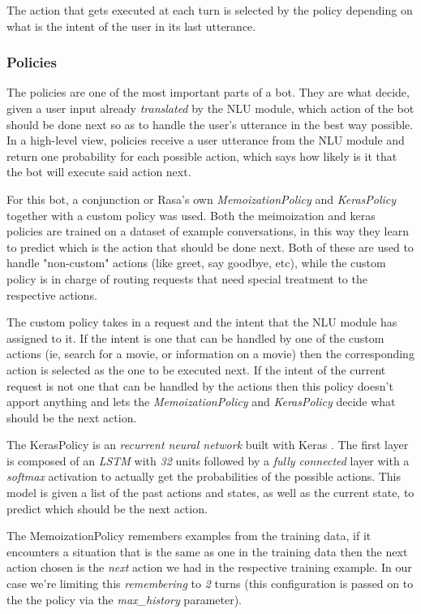 \documentclass[11pt,a4paper]{article}
\begin{document}
			The action that gets executed at each turn is selected by the policy depending on what is the intent of the user in its last utterance. 

		\subsubsection{Policies}
		\label{ssec-policies}	
			
			The policies are one of the most important parts of a bot. They are what decide, given a user input already \textit{translated} by the NLU module, which action of the bot should be done next so as to handle the user's utterance in the best way possible. In a high-level view, policies receive a user utterance from the NLU module and return one probability for each possible action, which says how likely is it that the bot will execute said action next.
			
			For this bot, a conjunction or Rasa's own \textit{MemoizationPolicy} and \textit{KerasPolicy} together with a custom policy was used. Both the meimoization and keras policies are trained on a dataset of example conversations, in this way they learn to predict which is the action that should be done next. Both of these are used to handle "non-custom" actions (like greet, say goodbye, etc), while the custom policy is in charge of routing requests that need special treatment to the respective actions. 
			
			The custom policy takes in a request and the intent that the NLU module has assigned to it. If the intent is one that can be handled by one of the custom actions (ie, search for a movie, or information on a movie) then the corresponding action is selected as the one to be executed next. If the intent of the current request is not one that can be handled by the actions then this policy doesn't apport anything and lets the \textit{MemoizationPolicy} and \textit{KerasPolicy} decide what should be the next action.
			
			The KerasPolicy is an \textit{recurrent neural network} built with Keras \cite{keras}. The first layer is composed of an \textit{LSTM} with \textit{32} units followed by a \textit{fully connected} layer with a \textit{softmax} activation to actually get the probabilities of the possible actions. This model is given a list of the past actions and states, as well as the current state, to predict which should be the next action.
			
			The MemoizationPolicy remembers examples from the training data, if it encounters a situation that is the same as one in the training data then the next action chosen is the \textit{next} action we had in the respective training example. In our case we're limiting this \textit{remembering} to \textit{2} turns (this configuration is passed on to the the policy via the \textit{max\_history} parameter).
		
\end{document}
